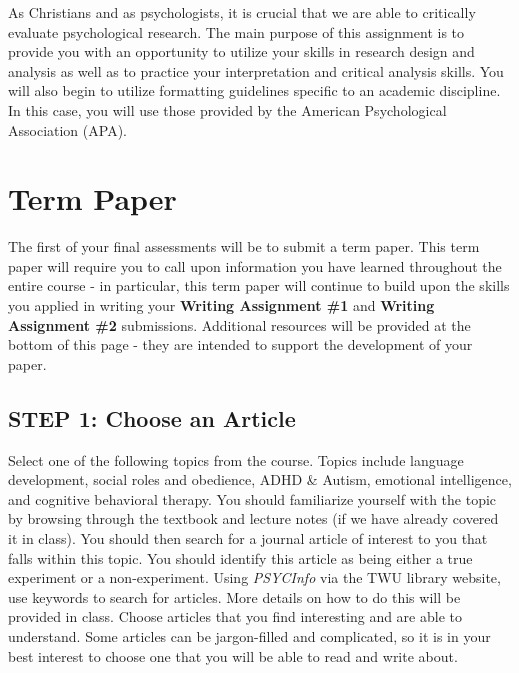 \documentclass[
]{book}
\begin{document}
As Christians and as psychologists, it is crucial that we are able to critically evaluate psychological research. The main purpose of this assignment is to provide you with an opportunity to utilize your skills in research design and analysis as well as to practice your interpretation and critical analysis skills. You will also begin to utilize formatting guidelines specific to an academic discipline. In this case, you will use those provided by the American Psychological Association (APA).

\hypertarget{term-paper}{%
\section{Term Paper}\label{term-paper}}

The first of your final assessments will be to submit a term paper. This term paper will require you to call upon information you have learned throughout the entire course - in particular, this term paper will continue to build upon the skills you applied in writing your \textbf{Writing Assignment \#1} and \textbf{Writing Assignment \#2} submissions. Additional resources will be provided at the bottom of this page - they are intended to support the development of your paper.

\hypertarget{step-1-choose-an-article}{%
\subsection*{STEP 1: Choose an Article}\label{step-1-choose-an-article}}

Select one of the following topics from the course. Topics include language development, social roles and obedience, ADHD \& Autism, emotional intelligence, and cognitive behavioral therapy. You should familiarize yourself with the topic by browsing through the textbook and lecture notes (if we have already covered it in class).
You should then search for a journal article of interest to you that falls within this topic. You should identify this article as being either a true experiment or a non-experiment. Using \emph{PSYCInfo} via the TWU library website, use keywords to search for articles. More details on how to do this will be provided in class. Choose articles that you find interesting and are able to understand. Some articles can be jargon-filled and complicated, so it is in your best interest to choose one that you will be able to read and write about.
\end{document}
